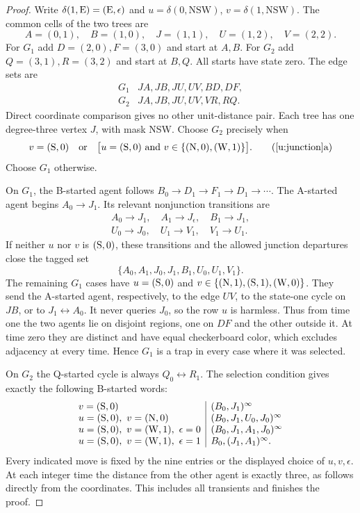 \begin{proof}
Write $\delta(1,\mathrm{E})=(\mathrm{E},\epsilon)$ and
$u=\delta(0,\mathrm{NSW})$, $v=\delta(1,\mathrm{NSW})$.
The common cells of the two trees are
\[
A=(0,1),\quad B=(1,0),\quad J=(1,1),\quad
U=(1,2),\quad V=(2,2).
\]
For $G_1$ add $D=(2,0),F=(3,0)$ and start at $A,B$.
For $G_2$ add $Q=(3,1),R=(3,2)$ and start at $B,Q$.
All starts have state zero. The edge sets are
\[
\begin{array}{c|l}
G_1&JA,JB,JU,UV,BD,DF,\\
G_2&JA,JB,JU,UV,VR,RQ.
\end{array}
\]
Direct coordinate comparison gives no other unit-distance pair.
Each tree has one degree-three vertex $J$, with mask NSW.
Choose $G_2$ precisely when
\[
 v=(\Sdir,0)\quad\text{or}\quad
 \bigl[u=(\Sdir,0)\text{ and }
 v\in\{(\N,0),(\W,1)\}\bigr].\tag{\ref{u:junction}a}
\]
Choose $G_1$ otherwise.

On $G_1$, the B-started agent follows
$B_0\to D_1\to F_1\to D_1\to\cdots$.
The A-started agent begins $A_0\to J_1$. Its relevant nonjunction
transitions are
\[
\begin{gathered}
A_0\to J_1,\quad A_1\to J_\epsilon,\quad B_1\to J_1,\\
U_0\to J_0,\quad U_1\to V_1,\quad V_1\to U_1.
\end{gathered}
\]
If neither $u$ nor $v$ is $(\mathrm{S},0)$, these transitions and the
allowed junction departures close the tagged set
\[
\{A_0,A_1,J_0,J_1,B_1,U_0,U_1,V_1\}.
\]
The remaining $G_1$ cases have $u=(\mathrm{S},0)$ and
$v\in\{(\mathrm{N},1),(\mathrm{S},1),(\mathrm{W},0)\}$.
They send the A-started agent, respectively, to the edge $UV$, to
the state-one cycle on $JB$, or to $J_1\leftrightarrow A_0$.
It never queries $J_0$, so the row $u$ is harmless.
Thus from time one the two agents lie on disjoint regions, one on
$DF$ and the other outside it. At time zero they are distinct and
have equal checkerboard color, which excludes adjacency at every
time. Hence $G_1$ is a trap in every case where it was selected.

On $G_2$ the Q-started cycle is always $Q_0\leftrightarrow R_1$.
The selection condition gives exactly the following B-started words:
\[
\begin{array}{l|l}
v=(\mathrm{S},0)&(B_0,J_1)^\infty\\
u=(\mathrm{S},0),\ v=(\mathrm{N},0)&(B_0,J_1,U_0,J_0)^\infty\\
u=(\mathrm{S},0),\ v=(\mathrm{W},1),\ \epsilon=0
 &(B_0,J_1,A_1,J_0)^\infty\\
u=(\mathrm{S},0),\ v=(\mathrm{W},1),\ \epsilon=1
 &B_0,(J_1,A_1)^\infty.
\end{array}
\]
Every indicated move is fixed by the nine entries or the displayed
choice of $u,v,\epsilon$. At each integer time the distance from
the other agent is exactly three, as follows directly from the
coordinates. This includes all transients and finishes the proof.
\end{proof}

